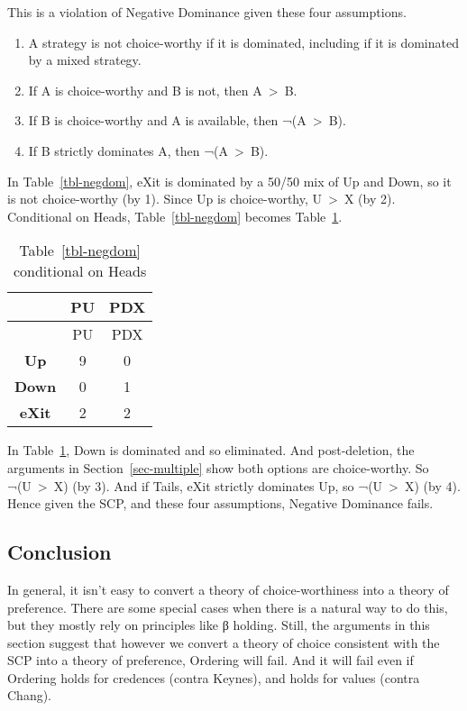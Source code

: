 \documentclass[
  11pt,
  letterpaper,
  DIV=11,
  numbers=noendperiod,
  twoside]{scrartcl}
\providecommand{\tightlist}{%
  \setlength{\itemsep}{0pt}\setlength{\parskip}{0pt}}\usepackage{longtable,booktabs,array}
\begin{document}
This is a violation of Negative Dominance given these four assumptions.

\begin{enumerate}
\def\labelenumi{\arabic{enumi}.}
\tightlist
\item
  A strategy is not choice-worthy if it is dominated, including if it is
  dominated by a mixed strategy.
\item
  If A is choice-worthy and B is not, then A~\textgreater~B.
\item
  If B is choice-worthy and A is available, then ¬(A~\textgreater~B).
\item
  If B strictly dominates A, then ¬(A~\textgreater~B).
\end{enumerate}

In Table~\ref{tbl-negdom}, eXit is dominated by a 50/50 mix of Up and
Down, so it is not choice-worthy (by 1). Since Up is choice-worthy,
U~\textgreater~X (by 2). Conditional on Heads, Table~\ref{tbl-negdom}
becomes Table~\ref{tbl-negdom-heads}.

\begin{longtable}[]{@{}ccc@{}}
\caption{Table~\ref{tbl-negdom} conditional on
Heads}\label{tbl-negdom-heads}\tabularnewline
\toprule\noalign{}
& PU & PDX \\
\midrule\noalign{}
\endfirsthead
\toprule\noalign{}
& PU & PDX \\
\midrule\noalign{}
\endhead
\bottomrule\noalign{}
\endlastfoot
\textbf{Up} & 9 & 0 \\
\textbf{Down} & 0 & 1 \\
\textbf{eXit} & 2 & 2 \\
\end{longtable}

In Table~\ref{tbl-negdom-heads}, Down is dominated and so eliminated.
And post-deletion, the arguments in Section~\ref{sec-multiple} show both
options are choice-worthy. So ¬(U~\textgreater~X) (by 3). And if Tails,
eXit strictly dominates Up, so ¬(U~\textgreater~X) (by 4). Hence given
the SCP, and these four assumptions, Negative Dominance fails.

\subsection{Conclusion}\label{sec-conclusion}

In general, it isn't easy to convert a theory of choice-worthiness into
a theory of preference. There are some special cases when there is a
natural way to do this, but they mostly rely on principles like β
holding. Still, the arguments in this section suggest that however we
convert a theory of choice consistent with the SCP into a theory of
preference, Ordering will fail. And it will fail even if Ordering holds
for credences (contra Keynes), and holds for values (contra Chang).
\end{document}

